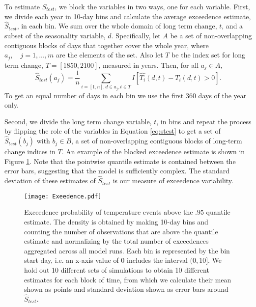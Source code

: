 \documentclass{ametsoc}
\newcommand\smallfigwidth{\columnwidth}
\begin{document}
To estimate $S_{test}$, we block the variables in two ways, one for each variable. First, we divide each year in 10-day bins and calculate the average exceedence estimate, $\hat{S}_{test}$, in each bin. We sum over the whole domain of long term change, $t$, and a subset of the seasonality variable, $d$. Specifically, let $A$ be a set of non-overlapping contiguous blocks of days that together cover the whole year, where $a_j, \quad j = 1, ..., m$ are the elements of the set. Also let $T$ be the index set for long term change, $T = [1850,2100]$, measured in years. Then, for all  $a_j \in A$,
\begin{equation}
\label{eq:stest}
\hat{S}_{test}(a_j) = \frac{1}{n}\sum_{i=[1,n], d\in a_j, t \in T} I\left[\hat{T_i}(d,t) - T_i(d,t) > 0\right].
\end{equation}
To get an equal number of days in each bin we use the first 360 days of the year only.

 Second, we divide the long term change variable, $t$, in bins and repeat the process by flipping the role of the variables in Equation \ref{eq:stest} to get a set of $\hat{S}_{test}(b_j)$ with $b_j \in B$, a set of non-overlapping contiguous blocks of long-term change indices in $T$. An example of the blocked exceedence estimate is shown in Figure \ref{Exeedence}. Note that the pointwise quantile estimate is contained between the error bars, suggesting that the model is sufficiently complex. The standard deviation of these estimates of $\hat{S}_{test}$ is our measure of exceedence variability. 


\begin{figure}[ht]
\centerline{\texttt{[image: Exeedence.pdf]}}
\caption{\small{Exceedence probability of temperature events above the $.95$ quantile estimate. The density is obtained by making 10-day bins and counting the number of observations that are above the quantile estimate and normalizing by the total number of exceedences aggregated across all model runs. Each bin is represented by the bin start day, i.e. an x-axis value of 0 includes the interval $(0,10]$. We hold out 10 different sets of simulations to obtain 10 different estimates for each block of time, from which we calculate their mean shown as points and standard deviation shown as error bars around $\hat{S}_{test}$.}}
\label{Exeedence}
\end{figure}
\end{document}
